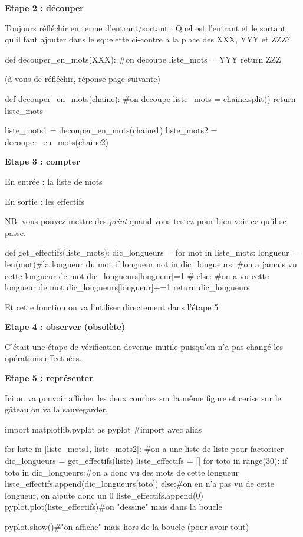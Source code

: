\textbf{Etape 2 : découper}

Toujours réfléchir en terme d'entrant/sortant : Quel est l'entrant et le  sortant qu'il faut ajouter dans le squelette ci-contre à la place des XXX, YYY et ZZZ?

\begin{python}
def decouper_en_mots(XXX):
  #on decoupe
  liste_mots = YYY
  return ZZZ

\end{python}

(à vous de réfléchir, réponse page suivante)
\newpage

\begin{python}
def decouper_en_mots(chaine):
  #on decoupe
  liste_mots = chaine.split()
  return liste_mots

liste_mots1 = decouper_en_mots(chaine1)
liste_mots2 = decouper_en_mots(chaine2)
\end{python}

\textbf{Etape 3 : compter}
	
En entrée : la liste de mots

En sortie : les effectifs

NB: vous pouvez mettre des \textit{print} quand vous testez pour bien voir ce qu'il se passe.

\begin{python}

def get_effectifs(liste_mots):
  dic_longueurs = {}
  for mot in liste_mots:
    longueur = len(mot)#la longueur du mot
    if longueur not in dic_longueurs: #on a jamais vu cette longueur de mot
      dic_longueurs[longueur]=1 #
    else: #on a vu cette longueur de mot
      dic_longueurs[longueur]+=1
  return dic_longueurs

\end{python}

Et cette fonction on va l'utiliser directement dans l'étape 5

\textbf{Etape 4 : observer (obsolète)}

 C'était une étape de vérification devenue inutile puisqu'on n'a pas changé les opérations effectuées. 

\textbf{Etape 5 : représenter}

Ici on va pouvoir afficher les deux courbes sur la même figure et cerise sur le gâteau on va la sauvegarder.

\begin{python}
import matplotlib.pyplot as pyplot #import avec alias

for liste in [liste_mots1, liste_mots2]: #on a une liste de liste pour factoriser
  dic_longueurs = get_effectifs(liste)
  liste_effectifs = []
  for toto in range(30):
    if toto in dic_longueurs:#on a donc vu des mots de cette longueur
      liste_effectifs.append(dic_longueurs[toto])
    else:#on en n'a pas vu de cette longueur, on ajoute donc un 0
      liste_effectifs.append(0)
  pyplot.plot(liste_effectifs)#on "dessine" mais dans la boucle

pyplot.show()#"on affiche" mais hors de la boucle (pour avoir tout)

\end{python}

